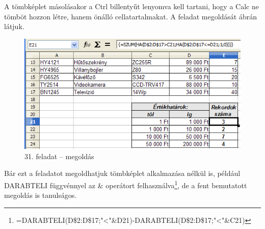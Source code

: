 A tömbképlet másolásakor a Ctrl billentyűt lenyomva kell
tartani, hogy a Calc ne tömböt hozzon létre, hanem önálló
cellatartalmakat. A feladat megoldását 
ábrán látjuk.

\begin{figure}[!h]
\begin{center}
\includegraphics[width=11.834cm]{oocalcv2-img139.png}
\caption{31. feladat -- megoldás}\label{31-feladatMegoldás}
\end{center}
\end{figure}

Bár ezt a feladatot megoldhatjuk tömbképlet
alkalmazása nélkül is, például DARABTELI függvénnyel az
\& operátort
felhasználva\footnote{=DARABTELI(D\$2:D\$17;"<"\&D21)-DARABTELI(D\$2:D\$17;"<"\&C21)},
de a fent bemutatott megoldás is tanulságos.


